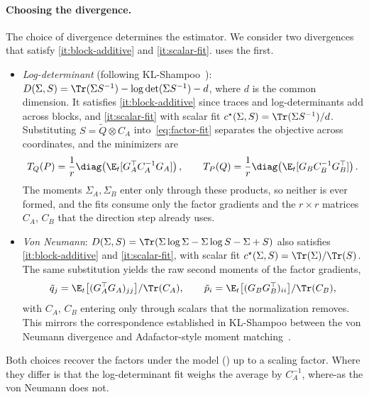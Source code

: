 \paragraph{Choosing the divergence.} The choice of divergence
determines the estimator. We consider two divergences that satisfy
\ref{it:block-additive} and \ref{it:scalar-fit}. \methodname{} uses the first.
\begin{itemize}[leftmargin=1.5em,itemsep=2pt,topsep=2pt]
  \item \emph{Log-determinant} (following KL-Shampoo~\cite{klshampoo}):
  $D(\Sigma,S)=\Tr(\Sigma S^{-1})-\log\det(\Sigma S^{-1})-d$, where $d$
  is the common dimension. It satisfies \ref{it:block-additive} since traces and
  log-determinants add across blocks, and \ref{it:scalar-fit} with scalar fit
  $c^\star(\Sigma,S)=\Tr(\Sigma S^{-1})/d$. Substituting
  $S=\tilde Q\otimes C_A$ into~\eqref{eq:factor-fit} separates the
  objective across coordinates, and the minimizers are
  \[
    T_Q(P)=\frac1r\diag\!\left(\E_t[G_A^\top C_A^{-1}G_A]\right),
    \qquad
    T_P(Q)=\frac1r\diag\!\left(\E_t[G_B C_B^{-1}G_B^\top]\right).
  \]
  The moments $\Sigma_A,\Sigma_B$ enter only through these products, so
  neither is ever formed, and the fits consume only the factor
  gradients and the $r\times r$ matrices $C_A$, $C_B$ that the
  direction step already uses.
  \item \emph{Von Neumann}:
  $D(\Sigma,S)=\Tr(\Sigma\log\Sigma-\Sigma\log S-\Sigma+S)$ also
  satisfies \ref{it:block-additive} and \ref{it:scalar-fit}, with scalar fit
  $c^\star(\Sigma,S)=\Tr(\Sigma)/\Tr(S)$. The same substitution yields
  the raw second moments of the factor gradients,
  \[
    \tilde q_j=\E_t\big[(G_A^\top G_A)_{jj}\big]/\Tr(C_A),
    \qquad
    \tilde p_i=\E_t\big[(G_B G_B^\top)_{ii}\big]/\Tr(C_B),
  \]
  with $C_A$, $C_B$ entering only through scalars that the
  normalization removes. This mirrors the correspondence established in
  KL-Shampoo between the von Neumann divergence and Adafactor-style
  moment matching~\cite{klshampoo}.
\end{itemize}
Both choices recover the factors under the model
() up to a scaling factor. Where they differ is that the
log-determinant fit weighs the average by $C_A^{-1}$, where-as the von
Neumann does not.
